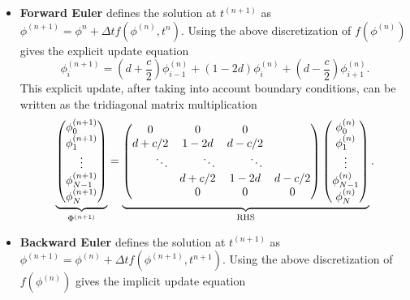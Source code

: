 \documentclass[reqno, 12pt]{amsart}
\begin{document}
    \begin{itemize}
        \item \textbf{Forward Euler} defines the solution at $t^{(n+1)}$ as $\phi^{(n+1)} = \phi^{n} + \Delta t f(\phi^{(n)},t^n)$.
        Using the above discretization of $f(\phi^{(n)})$ gives the explicit update equation
        \begin{equation*}
            \phi_{i}^{(n+1)} = \left(d + \frac{c}{2}\right)\phi_{i-1}^{(n)} + \left(1 - 2d\right)\phi_i^{(n)} + \left(d - \frac{c}{2}\right)\phi_{i + 1}^{(n)}.
        \end{equation*}
        This explicit update, after taking into account boundary conditions, can be written as the tridiagonal matrix multiplication
        \begin{equation*}
            \underbrace{
            \begin{pmatrix}
                \phi_0^{(n+1)} \\ 
                \phi_1^{(n+1)} \\ 
                \vdots \\ 
                \phi_{N-1}^{(n+1)} \\ 
                \phi_N^{(n+1)}
            \end{pmatrix}}_{\Phi^{(n+1)}}
            =
            \underbrace{
            \begin{pmatrix}
                0 & 0 & 0 \\ 
                d + c/2 & 1 - 2d & d - c/2 \\
                \hfill \ddots & \hfill \ddots & \hfill \ddots \\
                & d + c/2 & 1 - 2d & d - c/2 \\
                & 0 & 0 & 0
            \end{pmatrix}
            \begin{pmatrix}
                \phi_0^{(n)} \\ 
                \phi_1^{(n)} \\ 
                \vdots \\ 
                \phi_{N-1}^{(n)} \\ 
                \phi_N^{(n)}
            \end{pmatrix}}_{\text{RHS}}.
        \end{equation*}
    \item \textbf{Backward Euler} defines the solution at $t^{(n+1)}$ as $\phi^{(n+1)} = \phi^{(n)} + \Delta t f(\phi^{(n+1)}, t^{n+1})$.
        Using the above discretization of $f(\phi^{(n)})$ gives the implicit update equation

\end{itemize}
\end{document}
